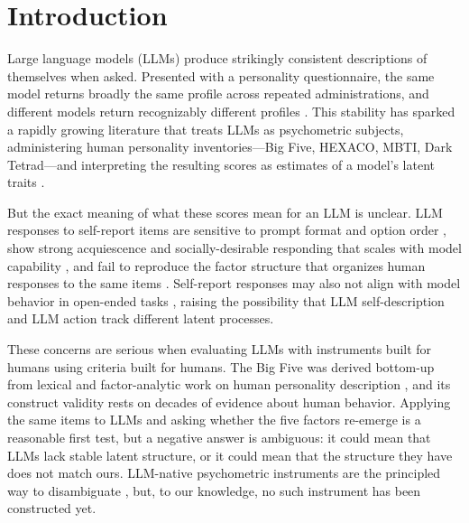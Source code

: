 \documentclass[11pt]{article}
\begin{document}
\section{Introduction}
\label{sec:intro}

Large language models (LLMs) produce strikingly consistent descriptions of themselves when asked.
Presented with a personality questionnaire, the same model returns broadly the same profile across repeated administrations, and different models return recognizably different profiles \citep{serapio2025personality, pellert2024aipsychometrics, heston2025llmprofiles, bhandari2025personality}.
This stability has sparked a rapidly growing literature that treats LLMs as psychometric subjects, administering human personality inventories---Big Five, HEXACO, MBTI, Dark Tetrad---and interpreting the resulting scores as estimates of a model's latent traits \citep{jiang2023mpi, serapio2025personality, lee2025trait, pellert2024aipsychometrics, ye2026llmpsychometrics, wen2024personality}.

But the exact meaning of what these scores mean for an LLM is unclear.
LLM responses to self-report items are sensitive to prompt format and option order \citep{gupta2024self, xie2025aipsychobench}, show strong acquiescence and socially-desirable responding that scales with model capability \citep{salecha2024social_desirability, dorner2023generalize}, and fail to reproduce the factor structure that organizes human responses to the same items \citep{Peereboom_2025, dorner2023generalize, wang2025gpt4roleplay}.
Self-report responses may also not align with model behavior in open-ended tasks \citep{li2024psychometrics}, raising the possibility that LLM self-description and LLM action track different latent processes.

These concerns are serious when evaluating LLMs with instruments built for humans using criteria built for humans.
The Big Five was derived bottom-up from lexical and factor-analytic work on human personality description \citep{john1999big}, and its construct validity rests on decades of evidence about human behavior.
Applying the same items to LLMs and asking whether the five factors re-emerge is a reasonable first test, but a negative answer is ambiguous: it could mean that LLMs lack stable latent structure, or it could mean that the structure they have does not match ours.
LLM-native psychometric instruments are the principled way to disambiguate \citep{wen2024personality, ye2026llmpsychometrics}, but, to our knowledge, no such instrument has been constructed yet.
\end{document}
